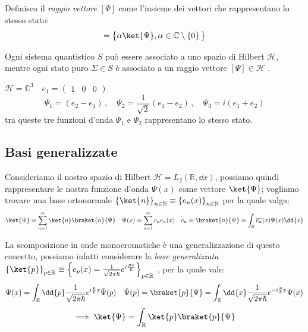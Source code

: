 \begin{definition}
    Definisco il \textit{raggio vettore} \([\Psi]\) come l'insieme dei vettori che rappresentano lo stesso stato:
    \begin{equation}
        [\Psi ]= \big\{ \alpha\ket{\Psi}, \alpha \in \mathbb{C} \setminus \left\{ 0 \right\} \big\}
    \end{equation}
\end{definition}

\begin{postulato1}
    Ogni sistema quantistico \(S\) può essere associato a uno spazio di Hilbert \(\mathcal{H}\), 
    mentre ogni stato puro \(\Sigma \in S\) è associato a un raggio vettore \([\Psi ]\in \mathcal{H}\) .
\end{postulato1}


\begin{example}
    \(\mathcal{H}= \mathbb{C}^3 \quad e_1= \begin{pmatrix}
        1   & 0 & 0
    \end{pmatrix}\)
    \[  
    \Psi_1= (e_2-e_1)\,,\quad \Psi_2= \frac{1}{\sqrt{2}}\left( e_1-e_2 \right)\,,\quad \Psi_3 = i(e_1+e_2)
    \]
    tra queste tre funzioni d'onda \(\Psi_1 \) e \( \Psi_2 \) rappresentano lo stesso stato.
\end{example}


\subsection{Basi generalizzate}

Consideriamo il nostro spazio di Hilbert \(\mathcal{H} = L_2(\mathbb{R}, \dd{x})\), 
possiamo quindi rappresentare le nostra funzione d'onda \(\Psi(x)\) come vettore \(\ket{\Psi}\); 
vogliamo trovare una base ortonormale \(\left\{ \ket{n} \right\}_{n \in \mathbb{N}} \equiv \left\{ e_n(x) \right\}_{n \in \mathbb{N}}\) 
per la quale valga:
\[
    \ket{\Psi}= \sum_{n= 1}^{\infty} \ket{n}\braket{n}{\Psi} \quad \Psi(x)= \sum_{n=1}^{\infty}c_n e_n(x)
    \quad c_n = \braket{n}{\Psi}= \int_{\mathbb{R}} \overline{e_n}(x)\Psi(x)\dd{x}
\]

La scomposizione in onde monocromatiche è una generalizzazione di questo concetto,
possiamo infatti considerare la \textit{base generalizzata} \(\left\{ \ket{p} \right\}_{p \in \mathbb{R}}\equiv \left\{ e_p(x) = \frac{1}{\sqrt{2\pi\hbar}} e^{i\frac{px}{\hbar}} \right\}_{p \in \mathbb{R}}\) ,
per la quale vale:
\begin{equation*}
    \Psi(x)= \int_{\mathbb{R}} \dd{p} \frac{1}{\sqrt{2\pi\hbar}} e^{i\frac{p}{\hbar}x}\tilde{\Psi}(p) \quad 
    \tilde{\Psi}(p)= \braket{p}{\Psi} = \int_\mathbb{R} \dd{x} \frac{1}{\sqrt{2\pi\hbar}} e^{-i\frac{p}{\hbar}x}\Psi(x)
\end{equation*}
\begin{equation}
    \implies \ket{\Psi}= \int_\mathbb{R} \ket{p} \braket{p}{\Psi}
\end{equation}

